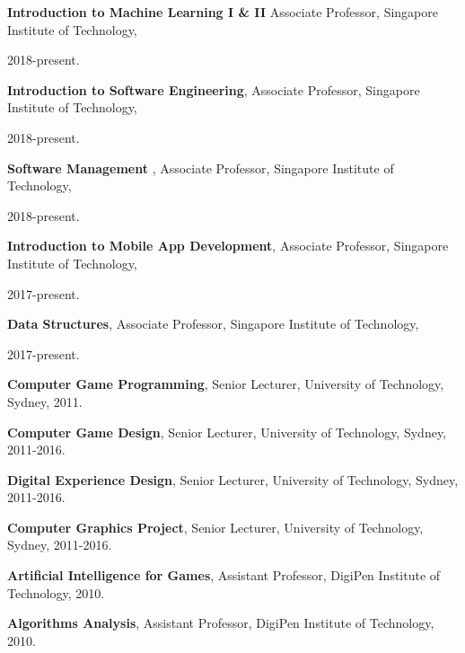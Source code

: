 \documentclass[10pt,a4paper]{article}
\renewenvironment{itemize}{
  \begin{list}{}{
    \setlength{\leftmargin}{1.5em}
    \setlength{\itemsep}{0.25em}
    \setlength{\parskip}{0pt}
    \setlength{\parsep}{0.25em}
  }
}{
  \end{list}
}
\begin{document}
\begin{itemize}

    \item \textbf{Introduction to Machine Learning I \& II} Associate Professor, Singapore Institute of Technology,

        2018-present.

    \item \textbf{Introduction to Software Engineering},
        Associate Professor, Singapore Institute of Technology,
        
        2018-present.

    \item \textbf{Software Management },
        Associate Professor, Singapore Institute of Technology,
        
        2018-present.

    \item \textbf{Introduction to Mobile App Development},
        Associate Professor, Singapore Institute of Technology,
        
        2017-present.

    \item \textbf{Data Structures},
        Associate Professor, Singapore Institute of Technology,
        
        2017-present.

    \item \textbf{Computer Game Programming},
        Senior Lecturer, University of Technology, Sydney,
        2011.

    \item \textbf{Computer Game Design},
        Senior Lecturer, University of Technology, Sydney,
        2011-2016.

    \item \textbf{Digital Experience Design},
        Senior Lecturer, University of Technology, Sydney,
        2011-2016.

    \item \textbf{Computer Graphics Project},
        Senior Lecturer, University of Technology, Sydney,
        2011-2016.

    \item \textbf{Artificial Intelligence for Games},
        Assistant Professor, DigiPen Institute of Technology,
        2010.

    \item \textbf{Algorithms Analysis},
        Assistant Professor, DigiPen Institute of Technology,
        2010.


\end{itemize}
\end{document}
